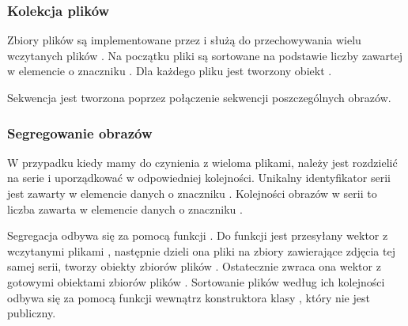 \subsubsection{Kolekcja plików \DICOM}
\label{sec:sokar-dicomfileset}
\par
Zbiory plików są implementowane przez  i służą do przechowywania wielu wczytanych plików \DICOM.
Na początku pliki są sortowane na podstawie liczby zawartej w elemencie o znaczniku .
Dla każdego pliku jest tworzony obiekt .
\par
Sekwencja jest tworzona poprzez połączenie sekwencji poszczególnych obrazów.

\subsubsection{Segregowanie obrazów}
\label{sec:sokar-dicomfileset-create}
\par
W przypadku kiedy mamy do czynienia z wieloma plikami, należy jest rozdzielić na serie i uporządkować w odpowiedniej kolejności.
Unikalny identyfikator serii jest zawarty w elemencie danych o znaczniku .
Kolejności obrazów w serii to liczba zawarta w elemencie danych o znaczniku .
\par
Segregacja odbywa się za pomocą funkcji .
Do funkcji jest przesyłany wektor z wczytanymi plikami \DICOM, następnie dzieli ona pliki na zbiory zawierające zdjęcia tej samej serii, tworzy obiekty zbiorów plików \DICOM.
Ostatecznie zwraca ona wektor z gotowymi obiektami zbiorów plików \DICOM.
Sortowanie plików \DICOM według ich kolejności odbywa się za pomocą funkcji  wewnątrz konstruktora klasy , który nie jest publiczny.